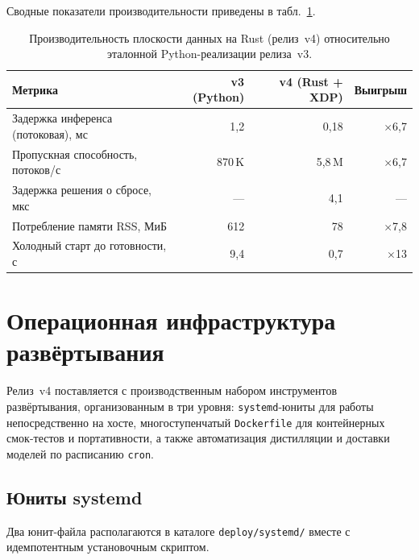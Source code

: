 Сводные показатели производительности приведены в
табл.~\ref{tab:rust_edge_perf}.

\begin{table}[H]
\centering
\caption{Производительность плоскости данных на Rust (релиз~v4)
относительно эталонной Python-реализации релиза~v3.}
\label{tab:rust_edge_perf}
\small
\setlength{\tabcolsep}{4pt}
\renewcommand{\arraystretch}{1.15}
\begin{tabular}{@{}lrrr@{}}
\toprule
\textbf{Метрика} & \textbf{v3 (Python)} & \textbf{v4 (Rust + XDP)} & \textbf{Выигрыш}\\
\midrule
Задержка инференса (потоковая), мс    & 1,2     & 0,18    & $\times$6,7\\
Пропускная способность, потоков/с     & 870\,K  & 5,8\,M  & $\times$6,7\\
Задержка решения о сбросе, мкс        & ---     & 4,1     & ---\\
Потребление памяти RSS, МиБ           & 612     & 78      & $\times$7,8\\
Холодный старт до готовности, с       & 9,4     & 0,7     & $\times$13\\
\bottomrule
\end{tabular}
\end{table}


\section{Операционная инфраструктура развёртывания}
\label{sec:operational_deployment}

Релиз~v4 поставляется с производственным набором инструментов
развёртывания, организованным в три уровня: \texttt{systemd}-юниты для
работы непосредственно на хосте, многоступенчатый \texttt{Dockerfile}
для контейнерных смок-тестов и портативности, а также автоматизация
дистилляции и доставки моделей по расписанию \texttt{cron}.

\subsection{Юниты systemd}

Два юнит-файла располагаются в каталоге \texttt{deploy/systemd/}
вместе с идемпотентным установочным скриптом.

